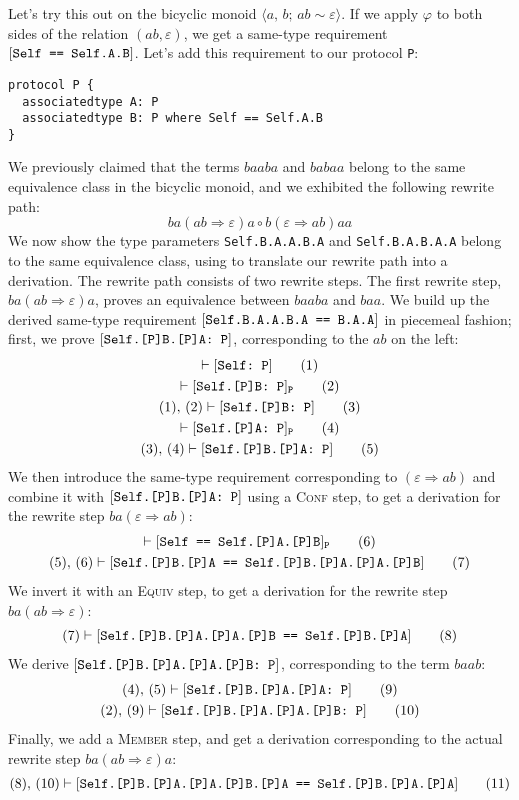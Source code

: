 \documentclass[../generics]{subfiles}
\begin{document}
Let's try this out on the bicyclic monoid $\langle a,\,b;\,ab\sim\varepsilon\rangle$. If we apply $\varphi$ to both sides of the relation $(ab,\varepsilon)$, we get a same-type requirement $[\texttt{Self == Self.A.B}]$. Let's add this requirement to our protocol \texttt{P}:
\begin{Verbatim}
protocol P {
  associatedtype A: P
  associatedtype B: P where Self == Self.A.B
}
\end{Verbatim}
We previously claimed that the terms $baaba$ and $babaa$ belong to the same equivalence class in the bicyclic monoid, and we exhibited the following rewrite path:
\[
ba(ab\Rightarrow\varepsilon)a \circ
b(\varepsilon\Rightarrow ab)aa
\]
We now show the type parameters \verb|Self.B.A.A.B.A| and \verb|Self.B.A.B.A.A| belong to the same equivalence class, using  to translate our rewrite path into a derivation. The rewrite path consists of two rewrite steps. The first rewrite step, $ba(ab\Rightarrow\varepsilon)a$, proves an equivalence between $baaba$ and $baa$. We build up the derived same-type requirement $[\texttt{Self.B.A.A.B.A == B.A.A}]$ in piecemeal fashion; first, we prove $[\texttt{Self.[P]B.[P]A:~P}]$, corresponding to the $ab$ on the left:
\begin{gather*}
\vdash[\texttt{Self:~P}]\tag{1}\\
\vdash[\texttt{Self.[P]B:~P}]_\texttt{P}\tag{2}\\
(1),\,(2)\vdash[\texttt{Self.[P]B:~P}]\tag{3}\\
\vdash[\texttt{Self.[P]A:~P}]_\texttt{P}\tag{4}\\
(3),\,(4)\vdash[\texttt{Self.[P]B.[P]A:~P}]\tag{5}
\end{gather*}
We then introduce the same-type requirement corresponding to $(\varepsilon\Rightarrow ab)$ and combine it with $[\texttt{Self.[P]B.[P]A:~P}]$ using a \textsc{Conf} step, to get a derivation for the rewrite step $ba(\varepsilon\Rightarrow ab)$:
\begin{gather*}
\vdash[\texttt{Self == Self.[P]A.[P]B}]_\texttt{P}\tag{6}\\
(5),\,(6)\vdash[\texttt{Self.[P]B.[P]A == Self.[P]B.[P]A.[P]A.[P]B}]\tag{7}
\end{gather*}
We invert it with an \textsc{Equiv} step, to get a derivation for the rewrite step $ba(ab\Rightarrow \varepsilon)$:
\begin{gather*}
(7)\vdash[\texttt{Self.[P]B.[P]A.[P]A.[P]B == Self.[P]B.[P]A}]\tag{8}
\end{gather*}
We derive $[\texttt{Self.[P]B.[P]A.[P]A.[P]B:~P}]$, corresponding to the term $baab$:
\begin{gather*}
(4),\,(5)\vdash[\texttt{Self.[P]B.[P]A.[P]A:~P}]\tag{9}\\
(2),\,(9)\vdash[\texttt{Self.[P]B.[P]A.[P]A.[P]B:~P}]\tag{10}
\end{gather*}
Finally, we add a \textsc{Member} step, and get a derivation corresponding to the actual rewrite step $ba(ab\Rightarrow\varepsilon)a$:
\begin{gather*}
(8),\,(10)\vdash[\texttt{Self.[P]B.[P]A.[P]A.[P]B.[P]A == Self.[P]B.[P]A.[P]A}]\tag{11}
\end{gather*}
\end{document}
